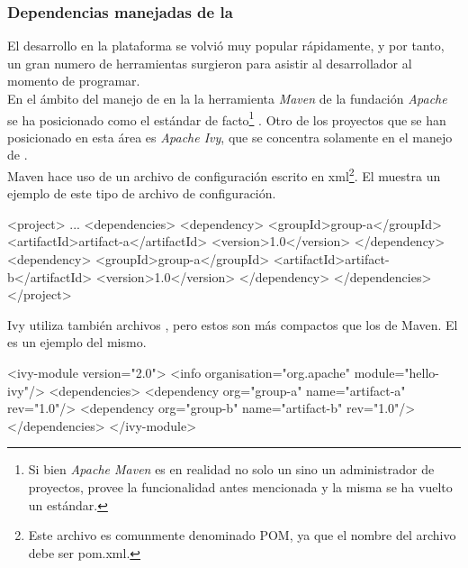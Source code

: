 \subsubsection{Dependencias manejadas de la \logictier}
\label{susubbsec:intro:jvm_dev:logic_dependencies}

El desarrollo en la plataforma \java se volvió muy popular rápidamente, y por tanto,
un gran numero de herramientas surgieron para asistir al desarrollador al momento
de programar.\\
En el ámbito del manejo de \dependencies en la \logictier la herramienta \emph{Maven}
de la fundación \emph{Apache} se ha posicionado como el estándar de facto\footnote{
	Si bien \emph{Apache Maven} es en realidad no solo un \depmgr
	sino un administrador de proyectos, provee la funcionalidad antes mencionada y
	la misma se ha vuelto un estándar.
} . Otro de los proyectos que se han posicionado en esta área
es \emph{Apache Ivy}, que se concentra solamente en el manejo de \dependencies.\\
Maven hace uso de un archivo de configuración escrito en \gls{xml}\footnote{
	Este archivo es comunmente denominado POM, ya que el nombre del archivo debe ser
	pom.xml.
}. El 
muestra un ejemplo de este tipo de archivo de configuración.
\\
\begin{pomcode}[caption=Configuración de \dependencies en Maven mediante archivo POM,
	label=code:intro:jvm:maven_pom]
<project>
	...
	<dependencies>
		<dependency>
			<groupId>group-a</groupId>
			<artifactId>artifact-a</artifactId>
			<version>1.0</version>
		</dependency>
		<dependency>
			<groupId>group-a</groupId>
			<artifactId>artifact-b</artifactId>
			<version>1.0</version>
		</dependency>
	</dependencies>
</project>
\end{pomcode}

Ivy utiliza también archivos \xml, pero estos son más compactos que los de Maven.
El  es un ejemplo del mismo.
\\
\begin{ivycode}[caption=Archivo de configuración de Ivy,
	label=code:intro:jvm:ivy_modulue]
<ivy-module version="2.0">
	<info organisation="org.apache" module="hello-ivy"/>
	<dependencies>
		<dependency org="group-a" name="artifact-a" rev="1.0"/>
		<dependency org="group-b" name="artifact-b" rev="1.0"/>
	</dependencies>
</ivy-module>
\end{ivycode}

